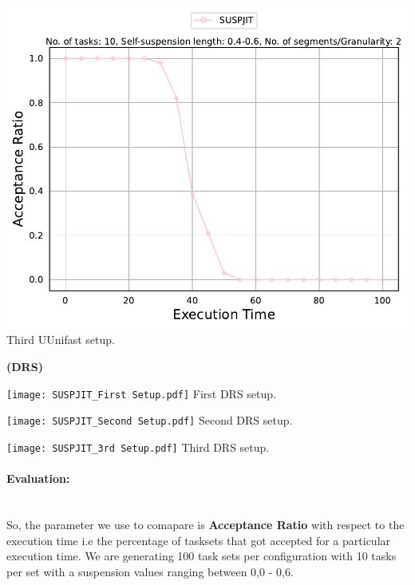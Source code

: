 \documentclass[]{article}
\begin{document}
\begin{minipage}[t]{0.48\linewidth}
		\includegraphics[width=\linewidth]{SUSPJIT[2][0.4-0.6][10].pdf}
		Third UUnifast setup.
		\vspace{0.3cm}
		
		
	\end{minipage}\hfill
	\begin{minipage}[t]{0.48\linewidth}
		\centering
		\textbf{(DRS)}
		\vspace{0.3cm}
		
		\texttt{[image: SUSPJIT\_First Setup.pdf]}
		First DRS setup.
		\vspace{0.3cm}
		
		\texttt{[image: SUSPJIT\_Second Setup.pdf]}
		Second DRS setup.
		\vspace{0.3cm}
		
		\texttt{[image: SUSPJIT\_3rd Setup.pdf]}
		Third DRS setup.
		\vspace{0.3cm}
	\end{minipage}

\paragraph{Evaluation:} \hspace{0pt} \\

{
\raggedleft So, the parameter we use to comapare is \textbf{Acceptance Ratio} with respect to the execution time i.e the percentage of tasksets that got accepted for a particular execution time. We are generating 100 task sets per configuration with 10 tasks per set with a suspension values ranging between 0,0 - 0,6. \newline
}
\end{document}
